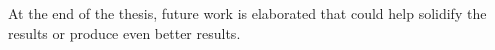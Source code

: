 At the end of the thesis, future work is elaborated that could help solidify the results or produce even better results.

% 



